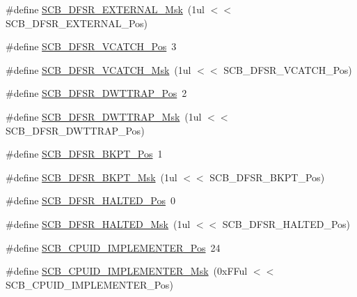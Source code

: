 \begin{DoxyCompactItemize}
\item 
\#define \hyperlink{group___c_m_s_i_s___c_m3___s_c_b_ga3cba2ec1f588ce0b10b191d6b0d23399}{S\-C\-B\-\_\-\-D\-F\-S\-R\-\_\-\-E\-X\-T\-E\-R\-N\-A\-L\-\_\-\-Msk}~(1ul $<$$<$ S\-C\-B\-\_\-\-D\-F\-S\-R\-\_\-\-E\-X\-T\-E\-R\-N\-A\-L\-\_\-\-Pos)
\item 
\#define \hyperlink{group___c_m_s_i_s___c_m3___s_c_b_gad02d3eaf062ac184c18a7889c9b6de57}{S\-C\-B\-\_\-\-D\-F\-S\-R\-\_\-\-V\-C\-A\-T\-C\-H\-\_\-\-Pos}~3
\item 
\#define \hyperlink{group___c_m_s_i_s___c_m3___s_c_b_gacbb931575c07b324ec793775b7c44d05}{S\-C\-B\-\_\-\-D\-F\-S\-R\-\_\-\-V\-C\-A\-T\-C\-H\-\_\-\-Msk}~(1ul $<$$<$ S\-C\-B\-\_\-\-D\-F\-S\-R\-\_\-\-V\-C\-A\-T\-C\-H\-\_\-\-Pos)
\item 
\#define \hyperlink{group___c_m_s_i_s___c_m3___s_c_b_gaccf82364c6d0ed7206f1084277b7cc61}{S\-C\-B\-\_\-\-D\-F\-S\-R\-\_\-\-D\-W\-T\-T\-R\-A\-P\-\_\-\-Pos}~2
\item 
\#define \hyperlink{group___c_m_s_i_s___c_m3___s_c_b_ga3f7384b8a761704655fd45396a305663}{S\-C\-B\-\_\-\-D\-F\-S\-R\-\_\-\-D\-W\-T\-T\-R\-A\-P\-\_\-\-Msk}~(1ul $<$$<$ S\-C\-B\-\_\-\-D\-F\-S\-R\-\_\-\-D\-W\-T\-T\-R\-A\-P\-\_\-\-Pos)
\item 
\#define \hyperlink{group___c_m_s_i_s___c_m3___s_c_b_gaf28fdce48655f0dcefb383aebf26b050}{S\-C\-B\-\_\-\-D\-F\-S\-R\-\_\-\-B\-K\-P\-T\-\_\-\-Pos}~1
\item 
\#define \hyperlink{group___c_m_s_i_s___c_m3___s_c_b_ga609edf8f50bc49adb51ae28bcecefe1f}{S\-C\-B\-\_\-\-D\-F\-S\-R\-\_\-\-B\-K\-P\-T\-\_\-\-Msk}~(1ul $<$$<$ S\-C\-B\-\_\-\-D\-F\-S\-R\-\_\-\-B\-K\-P\-T\-\_\-\-Pos)
\item 
\#define \hyperlink{group___c_m_s_i_s___c_m3___s_c_b_gaef4ec28427f9f88ac70a13ae4e541378}{S\-C\-B\-\_\-\-D\-F\-S\-R\-\_\-\-H\-A\-L\-T\-E\-D\-\_\-\-Pos}~0
\item 
\#define \hyperlink{group___c_m_s_i_s___c_m3___s_c_b_ga200bcf918d57443b5e29e8ce552e4bdf}{S\-C\-B\-\_\-\-D\-F\-S\-R\-\_\-\-H\-A\-L\-T\-E\-D\-\_\-\-Msk}~(1ul $<$$<$ S\-C\-B\-\_\-\-D\-F\-S\-R\-\_\-\-H\-A\-L\-T\-E\-D\-\_\-\-Pos)
\item 
\#define \hyperlink{group___c_m_s_i_s___c_m3___s_c_b_ga58686b88f94f789d4e6f429fe1ff58cf}{S\-C\-B\-\_\-\-C\-P\-U\-I\-D\-\_\-\-I\-M\-P\-L\-E\-M\-E\-N\-T\-E\-R\-\_\-\-Pos}~24
\item 
\#define \hyperlink{group___c_m_s_i_s___c_m3___s_c_b_ga0932b31faafd47656a03ced75a31d99b}{S\-C\-B\-\_\-\-C\-P\-U\-I\-D\-\_\-\-I\-M\-P\-L\-E\-M\-E\-N\-T\-E\-R\-\_\-\-Msk}~(0x\-F\-Ful $<$$<$ S\-C\-B\-\_\-\-C\-P\-U\-I\-D\-\_\-\-I\-M\-P\-L\-E\-M\-E\-N\-T\-E\-R\-\_\-\-Pos)

\end{DoxyCompactItemize}

